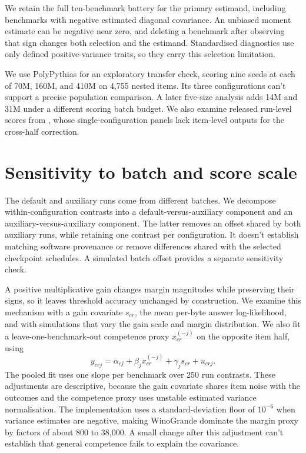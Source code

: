 \documentclass{article}
\begin{document}
We retain the full ten-benchmark battery for the primary estimand, including benchmarks with negative estimated diagonal covariance. An unbiased moment estimate can be negative near zero, and deleting a benchmark after observing that sign changes both selection and the estimand. Standardised diagnostics use only defined positive-variance traits, so they carry this selection limitation.

We use PolyPythias \citep{vanderwal2025} for an exploratory transfer check, scoring nine seeds at each of 70M, 160M, and 410M on 4,755 nested items. Its three configurations can't support a precise population comparison. A later five-size analysis adds 14M and 31M under a different scoring batch budget. We also examine released run-level scores from \citet{heineman2025}, whose single-configuration panels lack item-level outputs for the cross-half correction.

\section{Sensitivity to batch and score scale}
The default and auxiliary runs come from different batches. We decompose within-configuration contrasts into a default-versus-auxiliary component and an auxiliary-versus-auxiliary component. The latter removes an offset shared by both auxiliary runs, while retaining one contrast per configuration. It doesn't establish matching software provenance or remove differences shared with the selected checkpoint schedules. A simulated batch offset provides a separate sensitivity check.

A positive multiplicative gain changes margin magnitudes while preserving their signs, so it leaves threshold accuracy unchanged by construction. We examine this mechanism with a gain covariate $s_{cr}$, the mean per-byte answer log-likelihood, and with simulations that vary the gain scale and margin distribution. We also fit a leave-one-benchmark-out competence proxy $x_{cr}^{(-j)}$ on the opposite item half, using
\begin{equation}
y_{crj}=\alpha_{cj}+\beta_jx_{cr}^{(-j)}+\gamma_js_{cr}+u_{crj}.
\end{equation}
The pooled fit uses one slope per benchmark over 250 run contrasts. These adjustments are descriptive, because the gain covariate shares item noise with the outcomes and the competence proxy uses unstable estimated variance normalisation. The implementation uses a standard-deviation floor of $10^{-6}$ when variance estimates are negative, making WinoGrande dominate the margin proxy by factors of about 800 to 38,000. A small change after this adjustment can't establish that general competence fails to explain the covariance.
\end{document}

